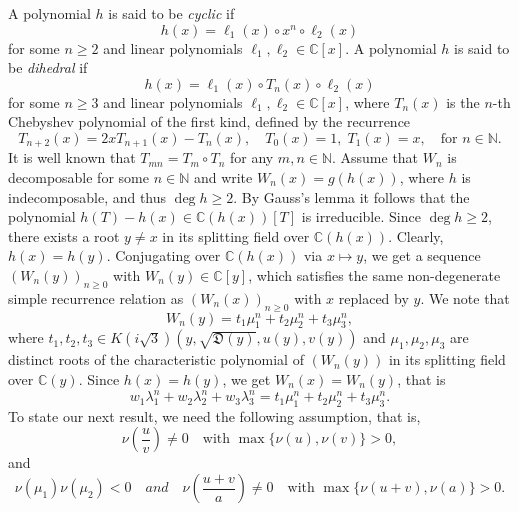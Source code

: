 \documentclass[12pt]{amsart}
\newcommand{\N}{\mbox{$\mathbb N$}}     %
\newcommand{\C}{\mbox{$\mathbb C$}}     %
\begin{document}
 A polynomial $h$ is said to be \emph{cyclic} if 
    \[
    h(x) = \ell_1(x) \circ x^n \circ \ell_2(x)
    \]
    for some $n \geq 2$ and linear polynomials $\ell_1, \ell_2\in \mathbb{C}[x]$. A polynomial $h$ is said to be \emph{dihedral} if 
    \[
    h(x) = \ell_1(x) \circ T_n(x) \circ \ell_2(x)
    \]
    for some $n \geq 3$ and linear polynomials $\ell_1, \ell_2\in \C [x]$, where $T_n(x)$ is the $n$-th Chebyshev polynomial of the first kind, defined by the recurrence
\[
T_{n+2}(x) = 2xT_{n+1}(x) - T_n(x), \quad T_0(x) = 1, \; T_1(x) = x, \quad \text{for } n\in \N.
\]
It is well known that $T_{mn}=T_m\circ T_n$ for any $m,n\in \N$. Assume that $W_n$ is decomposable for some $n\in \N$ and write $W_n(x)=g(h(x))$, where $h$ is indecomposable, and thus $\deg h\geq 2$. By Gauss's lemma it follows that the polynomial $h(T)-h(x)\in \C(h(x))[T]$ is irreducible. Since $\deg h\geq 2$, there exists a root $y\neq x$ in its splitting field over $\C(h(x))$. Clearly, $h(x)=h(y)$.
Conjugating over $\C(h(x))$ via $x\mapsto y$, we get a sequence $(W_n(y))_{n\geq0}$ with $W_n(y)\in \C[y]$, which satisfies the same non-degenerate simple recurrence relation as $(W_n(x))_{n\geq 0}$ with $x$ replaced by $y$. We note that
	\begin{equation*}
		W_n(y)=t_1\mu_1^n+t_2\mu_2^n+t_3\mu_3^n,
	\end{equation*} where $t_1,t_2,t_3\in K(i\sqrt{3})(y,\sqrt{\mathfrak{D}(y)},u(y),v(y)) $ and $\mu_1,\mu_2,\mu_3$ are distinct roots of the characteristic polynomial of $(W_n(y))$ in its splitting field over $\C(y)$. Since $h(x)=h(y)$, we get $W_n(x)=W_n(y)$, that is
\begin{equation}\label{thm2eq1}
w_1\lambda_1^n+w_2\lambda_2^n+w_3\lambda_3^n=t_1\mu_1^n+t_2\mu_2^n+t_3\mu_3^n.
\end{equation}
To state our next result, we need the following assumption, that is,
\begin{equation}\label{eqval13}
        \nu\left(\frac{u}{v}\right)\neq 0\quad \text{with } \max \{\nu(u), \nu(v)\}>0,
    \end{equation} and
    \begin{equation}\label{eqval14}
        \nu(\mu_1)\nu(\mu_2)<0 \quad and \quad\nu\left(\frac{u+v}{a}\right)\neq 0 \quad\text{with } \max\{\nu(u+v),\nu(a)\}>0.
    \end{equation}
\end{document}
